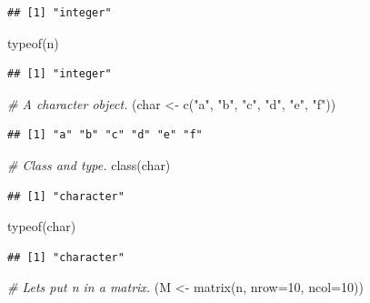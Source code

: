 \documentclass[
]{book}
\newenvironment{Shaded}{\begin{snugshade}}{\end{snugshade}}
\newcommand{\AttributeTok}[1]{\textcolor[rgb]{0.77,0.63,0.00}{#1}}
\newcommand{\CommentTok}[1]{\textcolor[rgb]{0.56,0.35,0.01}{\textit{#1}}}
\newcommand{\DecValTok}[1]{\textcolor[rgb]{0.00,0.00,0.81}{#1}}
\newcommand{\FunctionTok}[1]{\textcolor[rgb]{0.00,0.00,0.00}{#1}}
\newcommand{\NormalTok}[1]{#1}
\newcommand{\OtherTok}[1]{\textcolor[rgb]{0.56,0.35,0.01}{#1}}
\newcommand{\StringTok}[1]{\textcolor[rgb]{0.31,0.60,0.02}{#1}}
\begin{document}
\begin{verbatim}
## [1] "integer"
\end{verbatim}

\begin{Shaded}
\begin{Highlighting}[]
\FunctionTok{typeof}\NormalTok{(n)}
\end{Highlighting}
\end{Shaded}

\begin{verbatim}
## [1] "integer"
\end{verbatim}

\begin{Shaded}
\begin{Highlighting}[]
\CommentTok{\# A character object.}
\NormalTok{(char }\OtherTok{\textless{}{-}} \FunctionTok{c}\NormalTok{(}\StringTok{"a"}\NormalTok{, }\StringTok{"b"}\NormalTok{, }\StringTok{"c"}\NormalTok{, }\StringTok{"d"}\NormalTok{, }\StringTok{"e"}\NormalTok{, }\StringTok{"f"}\NormalTok{))}
\end{Highlighting}
\end{Shaded}

\begin{verbatim}
## [1] "a" "b" "c" "d" "e" "f"
\end{verbatim}

\begin{Shaded}
\begin{Highlighting}[]
\CommentTok{\# Class and type.}
\FunctionTok{class}\NormalTok{(char)}
\end{Highlighting}
\end{Shaded}

\begin{verbatim}
## [1] "character"
\end{verbatim}

\begin{Shaded}
\begin{Highlighting}[]
\FunctionTok{typeof}\NormalTok{(char)}
\end{Highlighting}
\end{Shaded}

\begin{verbatim}
## [1] "character"
\end{verbatim}

\begin{Shaded}
\begin{Highlighting}[]
\CommentTok{\# Let\textquotesingle{}s put n in a matrix.}
\NormalTok{(M }\OtherTok{\textless{}{-}} \FunctionTok{matrix}\NormalTok{(n, }\AttributeTok{nrow=}\DecValTok{10}\NormalTok{, }\AttributeTok{ncol=}\DecValTok{10}\NormalTok{))}
\end{Highlighting}
\end{Shaded}
\end{document}

